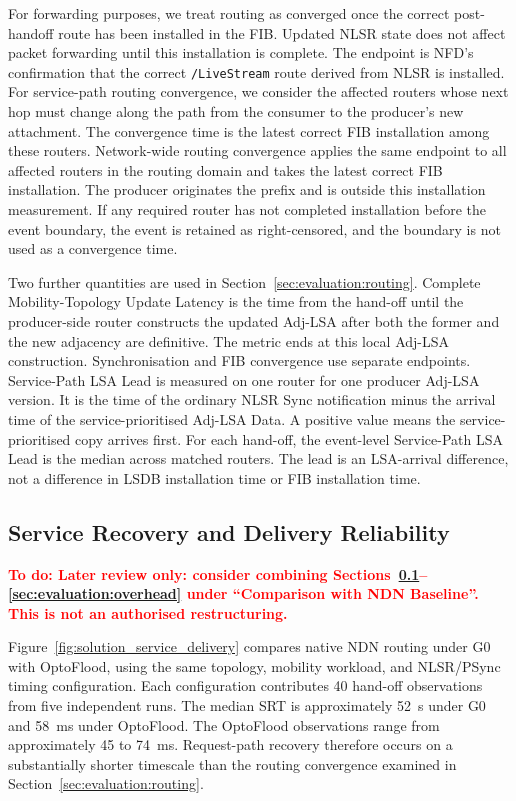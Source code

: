 \documentclass[10pt,conference]{IEEEtran}
\newcommand{\todo}[1]{\textbf{\textcolor{red}{To do: #1}}}
\begin{document}
For forwarding purposes, we treat routing as converged once the correct post-handoff route has been installed in the FIB. Updated NLSR state does not affect packet forwarding until this installation is complete. The endpoint is NFD's confirmation that the correct \texttt{/LiveStream} route derived from NLSR is installed. For service-path routing convergence, we consider the affected routers whose next hop must change along the path from the consumer to the producer's new attachment. The convergence time is the latest correct FIB installation among these routers. Network-wide routing convergence applies the same endpoint to all affected routers in the routing domain and takes the latest correct FIB installation. The producer originates the prefix and is outside this installation measurement. If any required router has not completed installation before the event boundary, the event is retained as right-censored, and the boundary is not used as a convergence time.

Two further quantities are used in Section~\ref{sec:evaluation:routing}. Complete Mobility-Topology Update Latency is the time from the hand-off until the producer-side router constructs the updated Adj-LSA after both the former and the new adjacency are definitive. The metric ends at this local Adj-LSA construction. Synchronisation and FIB convergence use separate endpoints. Service-Path LSA Lead is measured on one router for one producer Adj-LSA version. It is the time of the ordinary NLSR Sync notification minus the arrival time of the service-prioritised Adj-LSA Data. A positive value means the service-prioritised copy arrives first. For each hand-off, the event-level Service-Path LSA Lead is the median across matched routers. The lead is an LSA-arrival difference, not a difference in LSDB installation time or FIB installation time.

\subsection{Service Recovery and Delivery Reliability}
\label{sec:evaluation:service}

\todo{Later review only: consider combining Sections~\ref{sec:evaluation:service}--\ref{sec:evaluation:overhead} under ``Comparison with NDN Baseline''. This is not an authorised restructuring.}

Figure~\ref{fig:solution_service_delivery} compares native NDN routing under G0 with OptoFlood, using the same topology, mobility workload, and NLSR/PSync timing configuration. Each configuration contributes 40 hand-off observations from five independent runs. The median SRT is approximately 52~s under G0 and 58~ms under OptoFlood. The OptoFlood observations range from approximately 45 to 74~ms. Request-path recovery therefore occurs on a substantially shorter timescale than the routing convergence examined in Section~\ref{sec:evaluation:routing}.
\end{document}
